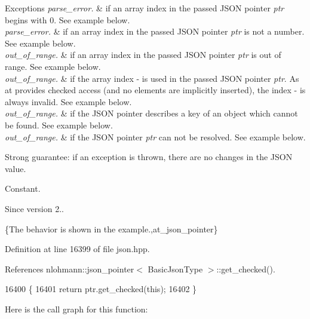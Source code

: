 \begin{DoxyExceptions}{Exceptions}
{\em parse\+\_\+error.} & if an array index in the passed J\+S\+ON pointer {\itshape ptr} begins with \textquotesingle{}0\textquotesingle{}. See example below.\\
\hline
{\em parse\+\_\+error.} & if an array index in the passed J\+S\+ON pointer {\itshape ptr} is not a number. See example below.\\
\hline
{\em out\+\_\+of\+\_\+range.} & if an array index in the passed J\+S\+ON pointer {\itshape ptr} is out of range. See example below.\\
\hline
{\em out\+\_\+of\+\_\+range.} & if the array index \textquotesingle{}-\/\textquotesingle{} is used in the passed J\+S\+ON pointer {\itshape ptr}. As {\ttfamily at} provides checked access (and no elements are implicitly inserted), the index \textquotesingle{}-\/\textquotesingle{} is always invalid. See example below.\\
\hline
{\em out\+\_\+of\+\_\+range.} & if the J\+S\+ON pointer describes a key of an object which cannot be found. See example below.\\
\hline
{\em out\+\_\+of\+\_\+range.} & if the J\+S\+ON pointer {\itshape ptr} can not be resolved. See example below.\\
\hline
\end{DoxyExceptions}
Strong guarantee\+: if an exception is thrown, there are no changes in the J\+S\+ON value.

Constant.

\begin{DoxySince}{Since}
version 2..
\end{DoxySince}
\{The behavior is shown in the example.,at\+\_\+json\+\_\+pointer\} 

Definition at line 16399 of file json.\+hpp.



References nlohmann\+::json\+\_\+pointer$<$ Basic\+Json\+Type $>$\+::get\+\_\+checked().


\begin{DoxyCode}
16400     \{
16401         \textcolor{keywordflow}{return} ptr.get\_checked(\textcolor{keyword}{this});
16402     \}
\end{DoxyCode}
Here is the call graph for this function\+:
\mbox{\label{classnlohmann_1_1basic__json_a7479d686148c26e252781bb32aa5d5c9}} 
